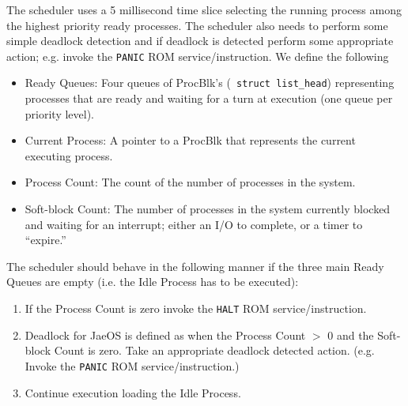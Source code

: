  The scheduler uses a 5 millisecond time slice selecting
the running process among the highest priority ready processes.
The scheduler also needs to perform some simple deadlock detection and if
deadlock is detected perform some appropriate action; e.g. invoke the
\verb+PANIC+
ROM service/instruction.
We define the following
\begin{itemize}
\item Ready Queues: Four queues of ProcBlk's (\verb+ struct list_head+)
representing processes that are ready and waiting for a turn at execution
(one queue per priority level).
\item Current Process: A pointer to a ProcBlk that represents the current executing process.
\item Process Count: The count of the number of processes in the system.
\item Soft-block Count: The number of processes in the system currently blocked
and waiting for an interrupt; either an I/O to complete, or a timer to “expire.”
\end{itemize}
The scheduler should behave in the following manner if the three main Ready Queues are
empty (i.e. the Idle Process has to be executed):
\begin{enumerate}
\item If the Process Count is zero invoke the \verb+HALT+ ROM service/instruction.
\item Deadlock for JaeOS is defined as when the Process Count $>$ 0 and the Soft-block 
Count is zero. Take an appropriate deadlock detected action. (e.g.
Invoke the \verb+PANIC+ ROM service/instruction.)
\item Continue execution loading the Idle Process.
\end{enumerate}
